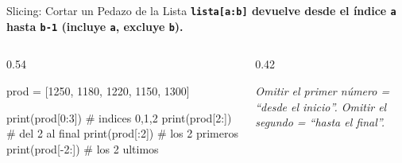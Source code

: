 \documentclass[aspectratio=169, 11pt]{beamer}
\begin{document}
\begin{frame}[fragile,shrink=10]{Slicing: Cortar un Pedazo de la Lista}
  \vspace{-4pt}
  {\small\color{arcaDark}\bfseries
    \texttt{lista[a:b]} devuelve desde el índice \texttt{a} hasta \texttt{b-1} (incluye \texttt{a}, excluye \texttt{b}).}

  \vspace{5pt}
  \begin{columns}[T]
    \begin{column}{0.54\textwidth}
      \begin{pyblock}
prod = [1250, 1180, 1220, 1150, 1300]

print(prod[0:3])   # indices 0,1,2
print(prod[2:])    # del 2 al final
print(prod[:2])    # los 2 primeros
print(prod[-2:])   # los 2 ultimos
      \end{pyblock}
    \end{column}

    \begin{column}{0.42\textwidth}
      \begin{outputblock}[]
[1250, 1180, 1220]
[1220, 1150, 1300]
[1250, 1180]
[1150, 1300]
      \end{outputblock}

      \vspace{4pt}
      {\scriptsize\color{textMuted}\itshape
        Omitir el primer número = ``desde el
        inicio''. Omitir el segundo = ``hasta
        el final''.}
    \end{column}
  \end{columns}
\end{frame}
\end{document}
